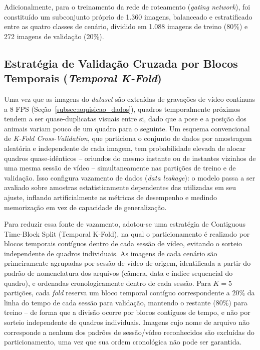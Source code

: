 \documentclass[12pt,fleqn]{article}
\begin{document}
Adicionalmente, para o treinamento da rede de roteamento (\textit{gating network}), foi constituído um subconjunto próprio de 1.360 imagens, balanceado e estratificado entre as quatro classes de cenário, dividido em 1.088 imagens de treino (80\%) e 272 imagens de validação (20\%).

\subsection{Estratégia de Validação Cruzada por Blocos Temporais (\textit{Temporal K-Fold})}
\label{subsec:temporal_kfold}

Uma vez que as imagens do \textit{dataset} são extraídas de gravações de vídeo contínuas a $8$ FPS (Seção~\ref{subsec:aquisicao_dados}), quadros temporalmente próximos tendem a ser quase-duplicatas visuais entre si, dado que a pose e a posição dos animais variam pouco de um quadro para o seguinte. Um esquema convencional de \textit{K-Fold Cross-Validation}, que particiona o conjunto de dados por amostragem aleatória e independente de cada imagem, tem probabilidade elevada de alocar quadros quase-idênticos -- oriundos do mesmo instante ou de instantes vizinhos de uma mesma sessão de vídeo -- simultaneamente nas partições de treino e de validação. Isso configura vazamento de dados (\textit{data leakage}): o modelo passa a ser avaliado sobre amostras estatisticamente dependentes das utilizadas em seu ajuste, inflando artificialmente as métricas de desempenho e medindo memorização em vez de capacidade de generalização.

Para reduzir essa fonte de vazamento, adotou-se uma estratégia de Contiguous Time-Block Split (Temporal K-Fold), na qual o particionamento é realizado por blocos temporais contíguos dentro de cada sessão de vídeo, evitando o sorteio independente de quadros individuais. As imagens de cada cenário são primeiramente agrupadas por sessão de vídeo de origem, identificada a partir do padrão de nomenclatura dos arquivos (câmera, data e índice sequencial do quadro), e ordenadas cronologicamente dentro de cada sessão. Para $K = 5$ partições, cada \textit{fold} reserva um bloco temporal contíguo correspondente a $20\%$ da linha do tempo de cada sessão para validação, mantendo o restante ($80\%$) para treino -- de forma que a divisão ocorre por blocos contíguos de tempo, e não por sorteio independente de quadros individuais. Imagens cujo nome de arquivo não corresponde a nenhum dos padrões de sessão/vídeo reconhecidos são excluídas do particionamento, uma vez que sua ordem cronológica não pode ser garantida.
\end{document}
